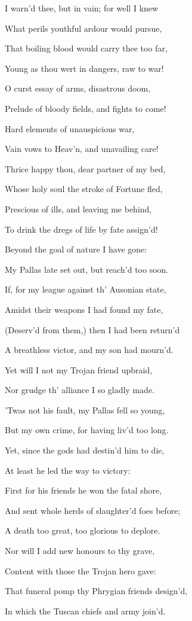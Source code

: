 I warn’d thee, but in vain; for well I knew

What perils youthful ardour would pursue,

That boiling blood would carry thee too far,

Young as thou wert in dangers, raw to war!

O curst essay of arms, disastrous doom,

Prelude of bloody fields, and fights to come!

Hard elements of unauspicious war,

Vain vows to Heav’n, and unavailing care!

Thrice happy thou, dear partner of my bed,

Whose holy soul the stroke of Fortune fled,

Prescious of ills, and leaving me behind,

To drink the dregs of life by fate assign’d!

Beyond the goal of nature I have gone:

My Pallas late set out, but reach’d too soon.

If, for my league against th’ Ausonian state,

Amidst their weapons I had found my fate,

(Deserv’d from them,) then I had been return’d

A breathless victor, and my son had mourn’d.

Yet will I not my Trojan friend upbraid,

Nor grudge th’ alliance I so gladly made.

’Twas not his fault, my Pallas fell so young,

But my own crime, for having liv’d too long.

Yet, since the gods had destin’d him to die,

At least he led the way to victory:

First for his friends he won the fatal shore,

And sent whole herds of slaughter’d foes before;

A death too great, too glorious to deplore.

Nor will I add new honours to thy grave,

Content with those the Trojan hero gave:

That funeral pomp thy Phrygian friends design’d,

In which the Tuscan chiefs and army join’d.

